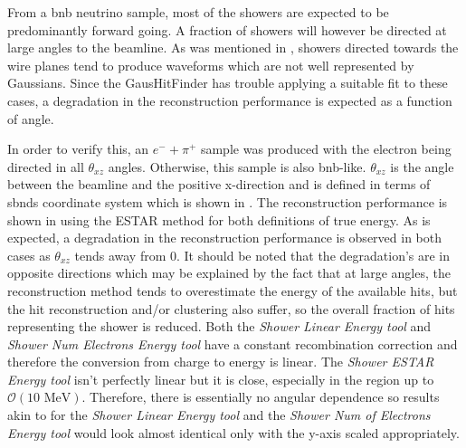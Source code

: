 From a \gls{bnb} neutrino sample, most of the showers are expected to be predominantly forward going. A fraction of showers will however be directed at large angles to the beamline. As was mentioned in , showers directed towards the wire planes tend to produce waveforms which are not well represented by Gaussians. Since the GausHitFinder has trouble applying a suitable fit to these cases, a degradation in the reconstruction performance is expected as a function of angle.

In order to verify this, an  $e^- + \pi^+$ sample was produced with the electron being directed in all $\theta_{xz}$ angles. Otherwise, this sample is also \gls{bnb}-like. $\theta_{xz}$ is the angle between the beamline and the positive x-direction and is defined in terms of \glspl{sbnd} coordinate system which is shown in . The reconstruction performance is shown in  using the ESTAR method for both definitions of true energy. As is expected, a degradation in the reconstruction performance is observed in both cases as $\theta_{xz}$ tends away from 0. It should be noted that the degradation's are in opposite directions which may be explained by the fact that at large angles, the reconstruction method tends to overestimate the energy of the available hits, but the hit reconstruction and/or clustering also suffer, so the overall fraction of hits representing the shower is reduced. Both the \textit{Shower Linear Energy tool} and \textit{Shower Num Electrons Energy tool} have a constant recombination correction and therefore the conversion from charge to energy is linear. The \textit{Shower ESTAR Energy tool} isn't perfectly linear but it is close, especially in the region up to $\mathcal{O}(10 \text{ MeV})$. Therefore, there is essentially no angular dependence so results akin to  for the \textit{Shower Linear Energy tool} and the \textit{Shower Num of Electrons Energy tool} would look almost identical only with the y-axis scaled appropriately. 

